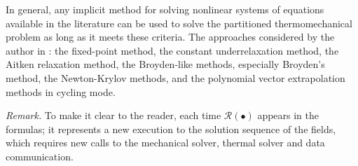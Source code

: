      In general, any implicit method for solving nonlinear systems of equations available in the literature can be used to solve the partitioned thermomechanical problem as long as it meets these criteria.
     The approaches considered by the author in \cite{vila-chaNumericalAssessmentPartitioned2023a}: the fixed-point method, the constant underrelaxation method, the Aitken relaxation method, the Broyden-like methods, especially Broyden's method, the Newton-Krylov methods, and the polynomial vector extrapolation methods in cycling mode.

     \smallskip
     \noindent \textit{Remark.} To make it clear to the reader, each time $\bm{\mathcal{R}}(\bullet)$ appears in the formulas; it represents a new execution to the solution sequence of the fields, which requires new calls to the mechanical solver, thermal solver and data communication.
     \smallskip
